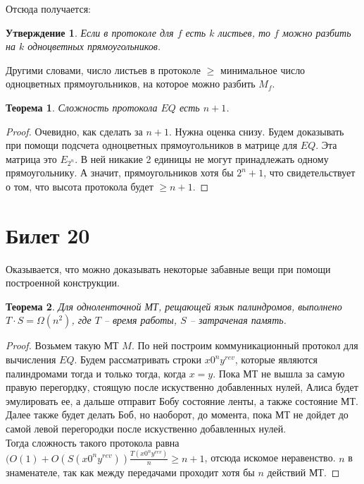 \documentclass[12pt, letterpaper]{article}
\newtheorem{theorem}{Теорема}[section]
\newtheorem{prop}{Утверждение}[section]
\begin{document}
Отсюда получается: 
\begin{prop}
Если в протоколе для $f$ есть $k$ листьев, то $f$ можно разбить на $k$ одноцветных прямоугольников.
\end{prop}
Другими словами, число листьев в протоколе $\geq$ минимальное число одноцветных прямоугольников, на которое можно разбить $M_f$. 	
\begin{theorem}
Сложность протокола $EQ$ есть $n+1$.
\end{theorem}
\begin{proof}
Очевидно, как сделать за $n+1$. Нужна оценка снизу. Будем доказывать при помощи подсчета одноцветных прямоугольников в матрице для $EQ$. Эта матрица это $E_{2^n}$. В ней никакие 2 единицы не могут принадлежать одному прямоугольнику. А значит, прямоугольников хотя бы $2^n+1$, что свидетельствует о том, что высота протокола будет $\geq n+1$. 
\end{proof}

\section{Билет 20}
Оказывается, что можно доказывать некоторые забавные вещи при помощи построенной конструкции.
\begin{theorem}
Для одноленточной МТ, рещающей язык палиндромов, выполнено $T \cdot S = \Omega(n^2)$, где $T$ -- время работы, $S$ -- затраченая память.
\end{theorem}
\begin{proof}
Возьмем такую МТ $M$. По ней построим коммуникационный протокол для вычисления $EQ$. Будем рассматривать строки $x0^ny^{rev}$, которые являются палиндромами тогда и только тогда, когда $x=y$. Пока МТ не вышла за самую правую перегордку, стоящую после искуственно добавленных нулей, Алиса будет эмулировать ее, а дальше отправит Бобу состояние ленты, а также состояние МТ. Далее также будет делать Боб, но наоборот, до момента, пока МТ не дойдет до самой левой перегородки после искуственно добавленных нулей. \\
Тогда сложность такого протокола равна $(O(1) + O(S(x0^ny^{rev})) \frac{T(x0^ny^{rev})}{n} \geq n + 1$, отсюда искомое неравенство. $n$ в знаменателе, так как между передачами проходит хотя бы $n$ действий МТ.
\end{proof}
\end{document}
